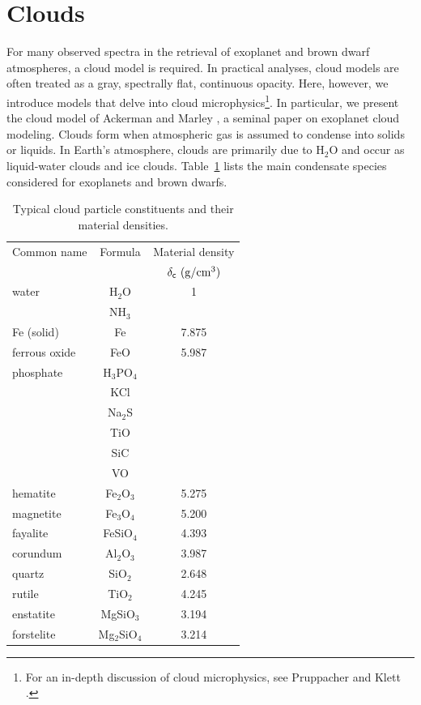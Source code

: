 \section{Clouds}

For many observed spectra in the retrieval of exoplanet and brown dwarf atmospheres, a cloud model is required.  
In practical analyses, cloud models are often treated as a gray, spectrally flat, continuous opacity.  
Here, however, we introduce models that delve into cloud microphysics\footnote{For an in-depth discussion of cloud microphysics, see Pruppacher and Klett \cite{pruppacher2010microstructure}.}.  
In particular, we present the cloud model of Ackerman and Marley \cite{ackerman2001precipitating}, a seminal paper on exoplanet cloud modeling.  
Clouds form when atmospheric gas is assumed to condense into solids or liquids.  
In Earth’s atmosphere, clouds are primarily due to H$_2$O and occur as liquid-water clouds and ice clouds.  
Table~\ref{tab:input2} lists the main condensate species considered for exoplanets and brown dwarfs.

\begin{table}[!tbh]
\begin{center}
\caption{Typical cloud particle constituents and their material densities.\label{tab:input2}}
\begin{tabular}{lcc}
  \hline\hline
  Common name & Formula & Material density \\
  & & $\delta_{\mathsf{c}} \ (\mathrm{g/cm^{3}})$ \\
  \hline
water & H$_2$O & 1 \\
& NH$_3$ & \\
Fe (solid) & Fe & 7.875 \\
ferrous oxide & FeO & 5.987 \\
phosphate & H$_3$PO$_4$ & \\
& KCl & \\
& Na$_2$S & \\
& TiO & \\
& SiC & \\
& VO & \\
hematite     & Fe$_2$O$_3$ & 5.275 \\
magnetite    & Fe$_3$O$_4$ & 5.200 \\
fayalite     & FeSiO$_4$ & 4.393 \\
corundum     & Al$_2$O$_3$ & 3.987 \\
quartz       & SiO$_2$ & 2.648 \\
rutile       & TiO$_2$ & 4.245 \\
enstatite    & MgSiO$_3$ & 3.194 \\
forstelite   & Mg$_2$SiO$_4$ & 3.214 \\
\end{tabular}
\end{center}
\end{table}

